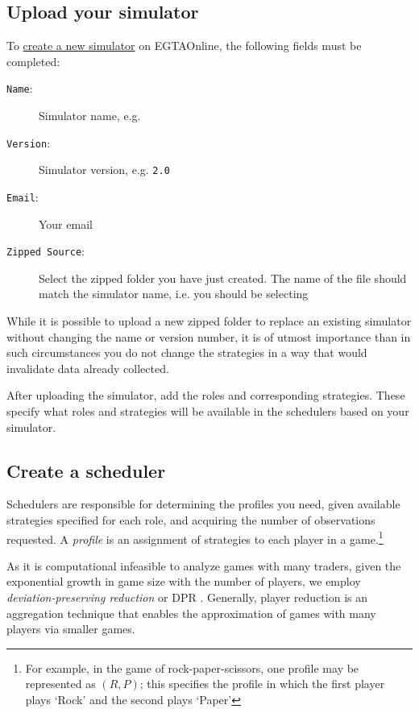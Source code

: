 \documentclass[11pt]{article}
\begin{document}
\subsection{Upload your simulator}

To \href{http://egtaonline.eecs.umich.edu/simulators/new}{create a new simulator} on EGTAOnline, the following fields must be completed:
\begin{description}
\item[\texttt{Name}:] Simulator name, e.g. 
\item[\texttt{Version}:] Simulator version, e.g. \verb|2.0|
\item[\texttt{Email}:] Your email
\item[\texttt{Zipped Source}:] Select the zipped folder you have just created. The name of the  file should match the simulator name, i.e. you should be selecting 
\end{description}
While it is possible to upload a new zipped folder to replace an existing simulator without changing the name or version number, it is of utmost importance than in such circumstances you do not change the strategies in a way that would invalidate data already collected.

After uploading the simulator, add the roles and corresponding strategies. These specify what roles and strategies will be available in the schedulers based on your simulator.

\subsection{Create a scheduler}

Schedulers are responsible for determining the profiles you need, given available strategies specified for each role, and acquiring the number of observations requested.
A \emph{profile} is an assignment of strategies to each player in a game.\footnote{For example, in the game of rock-paper-scissors, one profile may be represented as $(R,P)$; this specifies the profile in which the first player plays `Rock' and the second plays `Paper'}

As it is computational infeasible to analyze games with many traders, given the exponential growth in game size with the number of players, we employ \emph{deviation-preserving reduction} or DPR \citep{Wiedenbeck2012}.
Generally, player reduction is an aggregation technique that enables the approximation of games with many players via smaller games.
\end{document}
